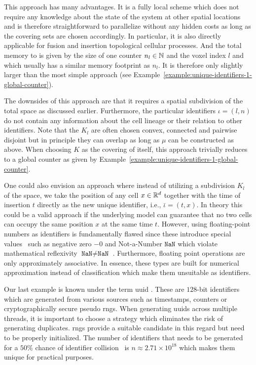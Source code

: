 This approach has many advantages.
It is a fully local scheme which does not require any knowledge about the state of the system at
other spatial locations and is therefore straightforward to parallelize without any hidden costs as
long as the covering sets are chosen accordingly.
In particular, it is also directly applicable for fusion and insertion topological cellular
processes.
And the total memory to is given by the size of one counter $n_l\in\mathbb{N}$ and the voxel index $l$ and
which usually has a similar memory footprint as $n_l$.
It is therefore only slightly larger than the most simple approach (see
Example~\ref{example:unique-identifiers-1-global-counter}).

The downsides of this approach are that it requires a spatial subdivision of the total space as
discussed earlier.
Furthermore, the particular identifiers $\iota=(l,n)$ do not contain any information about the cell
lineage or their relation to other identifiers.
Note that the $K_l$ are often chosen convex, connected and pairwise disjoint but in principle they
can overlap as long as $\mu$ can be constructed as above.
When choosing $K$ as the covering of itself, this approach trivially reduces to a global counter
as given by Example~\ref{example:unique-identifiers-1-global-counter}.

One could also envision an approach where instead of utilizing a subdivision $K_l$ of the space, we
take the position of any cell $x\in\mathbb{R}^d$ together with the time of insertion $t$ directly as the
new unique identifier, i.e., $\bar{\iota}=(t,x)$.
In theory this could be a valid approach if the underlying model can guarantee that no two cells can
occupy the same position $x$ at the same time $t$.
However, using floating-point numbers as identifiers is fundamentally flawed since these introduce
special values~\cite{IEEE754-1985,IEEE754-2008} such as negative zero $-0$ and Not-a-Number
$\texttt{NaN}$ which violate mathematical reflexivity $\texttt{NaN}\neq\texttt{NaN}$
\cite{Goldberg1991}.
Furthermore, floating point operations are only approximately associative.
In essence, these types are built for numerical approximation instead of classification which make
them unsuitable as identifiers.

Our last example is known under the term \ac{uuid} \cite{Leach2005,Davis2024}.
These are $128$-bit identifiers which are generated from various sources such as timestamps,
counters or cryptographically secure pseudo \acp{rng}.
When generating \acp{uuid} across multiple threads, it is important to choose a strategy which
eliminates the risk of generating duplicates.
\acp{rng} provide a suitable candidate in this regard but need to be properly initialized.
The number of identifiers that needs to be generated for a $50\%$ chance of identifier
collision~\cite{Mathis1991} is $n\approx 2.71\times 10^{18}$ which makes them unique for practical
purposes.

